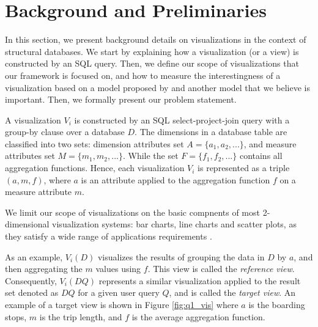 \section{Background and Preliminaries}
\label{sec:prelim}
%
%
In this section, we present background details on visualizations in the context of structural databases.
%
We start by explaining how a visualization (or a view) is constructed by an SQL query. 
%
Then, we define our scope of visualizations that our framework is focused on, and how to measure the interestingness of a visualization based on a model proposed by \cite{DBLP:journals/pvldb/VartakMPP14} and another model that we believe is important.
%
Then, we formally present our problem statement.
%

A visualization $V_i$ is constructed by an SQL select-project-join query with a group-by clause over a database $D$.
% 
The dimensions in a database table are classified into two sets: dimension attributes set $A=\{a_1, a_2, ...\}$, and measure attributes set $M=\{m_1, m_2, ... \}$. While the set $F=\{f_1, f_2, ... \}$ contains all aggregation functions.
%
Hence, each visualization $V_i$ is represented as a triple $(a, m, f)$, where $a$ is an attribute applied to the aggregation function $f$ on a measure attribute $m$.
% 

We limit our scope of visualizations on the basic compnents of most 2-dimensional visualization systems: bar charts, line charts and scatter plots, as they satisfy a wide range of applications requirements \cite{Jugel:2016:VAV:2884416.2884424}. 
%

As an example, $V_i(D)$ visualizes the results of grouping the data in $D$ by $a$, and then 
aggregating the $m$ values using $f$. 
%
This view is called the \emph{reference view}.
%
Consequently, $V_i(DQ)$ represents a similar visualization applied to the result set denoted as $DQ$ for a given user query $Q$, and is called the \emph{target view}.
%
An example of a target view is shown in Figure \ref{fig:q1_vis} where $a$ is the boarding stops, $m$ is the trip length, and $f$ is the average aggregation function.
%

